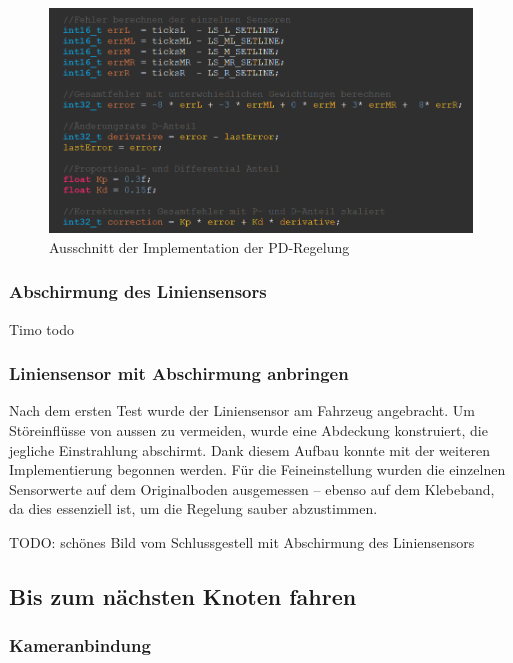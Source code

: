  \begin{figure}[H]
\centering
\includegraphics[width= \textwidth ]{assets/ET/PD-Regler/PD-Regler_Code_Pren2.png}
\caption{Ausschnitt der Implementation der PD-Regelung}
\label{fig:Ausschnitt der Implementation der PD-Regelung}
\end{figure}

 
\subsubsection{Abschirmung des Liniensensors}
Timo todo
\subsubsection{Liniensensor mit Abschirmung anbringen}

Nach dem ersten Test wurde der Liniensensor am Fahrzeug angebracht. Um Störeinflüsse von aussen zu vermeiden, wurde eine Abdeckung konstruiert, die jegliche Einstrahlung abschirmt. Dank diesem Aufbau konnte mit der weiteren Implementierung begonnen werden. Für die Feineinstellung wurden die einzelnen Sensorwerte auf dem Originalboden ausgemessen – ebenso auf dem Klebeband, da dies essenziell ist, um die Regelung sauber abzustimmen.



TODO: schönes Bild vom Schlussgestell mit Abschirmung des Liniensensors


\newpage

\subsection{Bis zum nächsten Knoten fahren}

\subsubsection{Kameranbindung}

